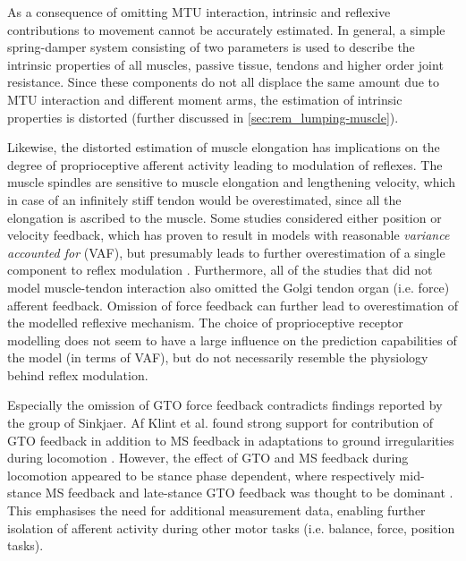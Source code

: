 As a consequence of omitting MTU interaction, intrinsic and reflexive contributions to movement cannot be accurately estimated.  
In general, a simple spring-damper system consisting of two parameters is used to describe the intrinsic properties of all muscles, passive tissue, tendons and higher order joint resistance. Since these components do not all displace the same amount due to MTU interaction and different moment arms, the estimation of intrinsic properties is distorted (further discussed in \autoref{sec:rem_lumping-muscle}). 

Likewise, the distorted estimation of muscle elongation has implications on the degree of proprioceptive afferent activity leading to modulation of reflexes. The muscle spindles are sensitive to muscle elongation and lengthening velocity, which in case of an infinitely stiff tendon would be overestimated, since all the elongation is ascribed to the muscle. Some studies considered either position or velocity feedback, which has proven to result in models with reasonable \textit{variance accounted for} (VAF), but presumably leads to further overestimation of a single component to reflex modulation \cite{maas_is_2009}. Furthermore, all of the studies that did not model muscle-tendon interaction also omitted the Golgi tendon organ (i.e. force) afferent feedback. Omission of force feedback can further lead to overestimation of the modelled reflexive mechanism. The choice of proprioceptive receptor modelling does not seem to have a large influence on the prediction capabilities of the model (in terms of VAF), but do not necessarily resemble the physiology behind reflex modulation. 

Especially the omission of GTO force feedback contradicts findings reported by the group of Sinkjaer. Af Klint et al. found strong support for contribution of GTO feedback in addition to MS feedback in adaptations to ground irregularities during locomotion \cite{klint_afferent_2009}. However, the effect of GTO and MS feedback during locomotion appeared to be stance phase dependent, where respectively mid-stance MS feedback and late-stance GTO feedback was thought to be dominant \cite{grey_positive_2007, af_klint_sudden_2009}. This emphasises the need for additional measurement data, enabling further isolation of afferent activity during other motor tasks (i.e. balance, force, position tasks). 

